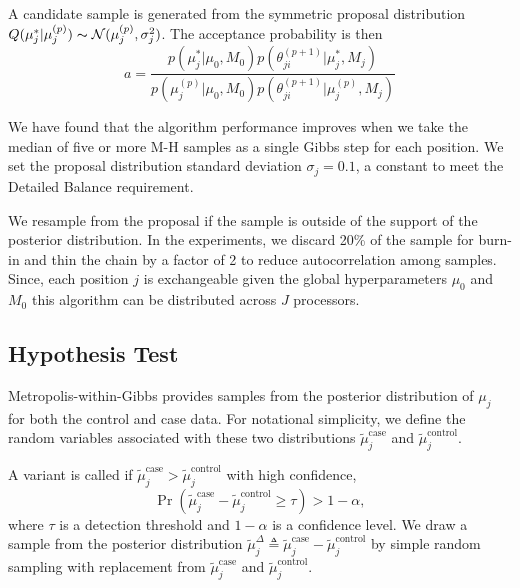 \documentclass[11pt,reqno]{amsart}
\begin{document}
A candidate sample is generated from the symmetric proposal distribution $Q(\mu_j^* | \mu_j^{(p)}) \thicksim \mathcal{N}(\mu_j^{(p)}, \sigma_j^2)$. The acceptance probability is then
\begin{equation}
	a = \frac{ p(\mu_j^* | \mu_0, M_0) p(\theta^{(p+1)}_{ji} | \mu_j^*, M_j) } {p(\mu_j^{(p)} | \mu_0, M_0) p(\theta^{(p+1)}_{ji} | \mu_j^{(p)}, M_j)}
\end{equation}

We have found that the algorithm performance improves when we take the median of five or more M-H samples as a single Gibbs step for each position. We set the proposal distribution standard deviation $\sigma_j = 0.1$, a constant to meet the Detailed Balance requirement.


We resample from the proposal if the sample is outside of the support of the posterior distribution. In the experiments, we discard 20\% of the sample for burn-in and thin the chain by a factor of 2 to reduce autocorrelation among samples. Since, each position $j$ is exchangeable given the global hyperparameters $\mu_0$ and $M_0$ this algorithm can be distributed across $J$ processors. 

\subsection{Hypothesis Test}\label{sec:hypothesis_test}
Metropolis-within-Gibbs provides samples from the posterior distribution of $\mu_j$ for both the control and case data. For notational simplicity, we define the random variables associated with these two distributions $\tilde{\mu}_j^{\text{case}}$ and $\tilde{\mu}_j^{\text{control}}$.

A variant is called if $\tilde{\mu}_j^{\text{case}} > \tilde{\mu}_j^{\text{control}}$ with high confidence,
\begin{equation}\label{eqn:bayes_test}
	\Pr( \tilde{\mu}_j^{\text{case}} - \tilde{\mu}_j^{\text{control}} \geq \tau ) > 1-\alpha,
\end{equation}
where $\tau$ is a detection threshold and $1-\alpha$ is a confidence level. We draw a sample from the posterior distribution $\tilde{\mu}_j^{\Delta} \triangleq \tilde{\mu}_j^{\text{case}} - \tilde{\mu}_j^{\text{control}}$ by simple random sampling with replacement from $\tilde{\mu}_j^{\text{case}}$ and $\tilde{\mu}_j^{\text{control}}$.
\end{document}
